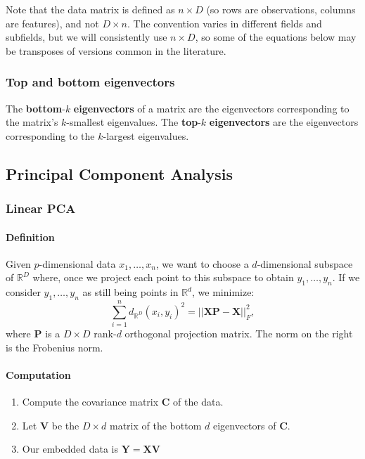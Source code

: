 \documentclass[12pt,a4paper]{article}
\newcommand{\1}[1]{\mathds{1}\left[#1\right]}
\newcommand{\R}{\mathbb{R}}
\newcommand{\B}[1]{\mathbf{#1}}
\begin{document}
Note that the data matrix is defined as $n\times D$ (so rows are observations, columns are features), and not $D\times n$. The convention varies in different fields and subfields, but we will consistently use $n\times D$, so some of the equations below may be transposes of versions common in the literature.


\subsubsection{Top and bottom eigenvectors}
\noindent The \textbf{bottom}-$k$ \textbf{eigenvectors} of a matrix are the eigenvectors corresponding to the matrix's $k$-smallest eigenvalues. The \textbf{top}-$k$ \textbf{eigenvectors} are the eigenvectors corresponding to the $k$-largest eigenvalues.

\subsection{Principal Component Analysis}
\subsubsection{Linear PCA}
\paragraph{Definition}
Given $p$-dimensional data $x_1,\ldots,x_n$, we want to choose a $d$-dimensional subspace of $\R^D$ where, once we project each point to this subspace to obtain $y_1,\ldots,y_n$. If we consider $y_1,\ldots,y_n$ as still being points in $\R^d$, we minimize:
\[\sum_{i=1}^n d_{\R^D}(x_i,y_i)^2=||\B X\B P-\B X||_F^2,\]
where $\B P$ is a $D\times D$ rank-$d$ orthogonal projection matrix. The norm on the right is the Frobenius norm.
\paragraph{Computation}
\begin{enumerate}
    \item Compute the covariance matrix $\B C$ of the data.
    \item Let $\B V$ be the $D\times d$ matrix of the bottom $d$ eigenvectors of $\B C$.
    \item Our embedded data is $\B Y=\B{X}\B V$
\end{enumerate}
\end{document}
